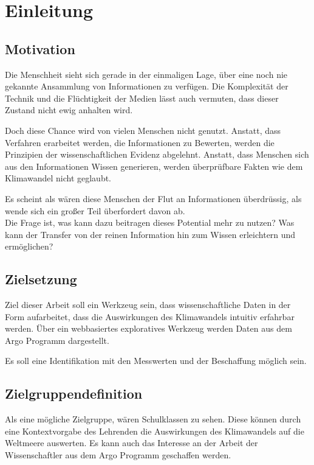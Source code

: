 \section{Einleitung}

    \subsection{Motivation}
    
    Die Menschheit sieht sich gerade in der einmaligen Lage, über eine noch nie gekannte Ansammlung von Informationen zu verfügen. Die Komplexität der Technik und die Flüchtigkeit der Medien lässt auch vermuten, dass dieser Zustand nicht ewig anhalten wird.
    
    Doch diese Chance wird von vielen Menschen nicht genutzt. Anstatt, dass  Verfahren erarbeitet werden, die Informationen zu Bewerten, werden die Prinzipien der wissenschaftlichen Evidenz abgelehnt. Anstatt, dass Menschen sich aus den Informationen Wissen generieren, werden überprüfbare Fakten wie dem Klimawandel nicht geglaubt.
    
    Es scheint als wären diese Menschen der Flut an Informationen überdrüssig, als wende sich ein großer Teil überfordert davon ab.\\
    
    Die Frage ist, was kann dazu beitragen dieses Potential mehr zu nutzen? Was kann der Transfer von der reinen Information hin zum Wissen erleichtern und ermöglichen?
    
    
    \subsection{Zielsetzung}
    
    Ziel dieser Arbeit soll ein Werkzeug sein, dass wissenschaftliche Daten in der Form aufarbeitet, dass die Auswirkungen des Klimawandels intuitiv erfahrbar werden.
    Über ein webbasiertes exploratives Werkzeug werden Daten aus dem Argo Programm dargestellt. 
    
    Es soll eine Identifikation mit den Messwerten und der Beschaffung möglich sein.
    
    
    \subsection{Zielgruppendefinition}
    
    Als eine mögliche Zielgruppe, wären Schulklassen zu sehen. Diese können durch eine Kontextvorgabe des Lehrenden  die Auswirkungen des Klimawandels auf die Weltmeere auswerten. Es kann auch das Interesse an der Arbeit der Wissenschaftler aus dem Argo Programm geschaffen werden. 

